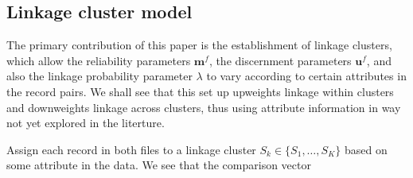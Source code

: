 \documentclass[
  12pt,
]{article}
\begin{document}
\hypertarget{linkage-cluster-model}{%
\subsection{Linkage cluster model}\label{linkage-cluster-model}}

The primary contribution of this paper is the establishment of linkage
clusters, which allow the reliability parameters \(\mathbf{m}^f\), the
discernment parameters \(\mathbf{u}^f\), and also the linkage
probability parameter \(\lambda\) to vary according to certain
attributes in the record pairs. We shall see that this set up upweights
linkage within clusters and downweights linkage across clusters, thus
using attribute information in way not yet explored in the literture.

Assign each record in both files to a linkage cluster
\(S_k \in \{S_1, \ldots, S_K\}\) based on some attribute in the data. We
see that the comparison vector
\end{document}
